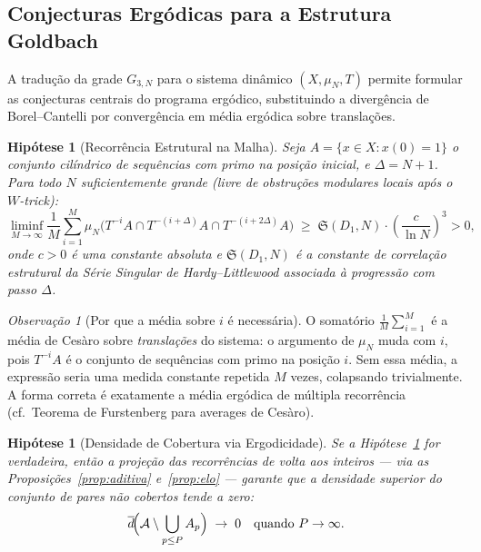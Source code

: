 \documentclass[12pt,a4paper]{article}
\newtheorem{hypothesis}[theorem]{Hip\'otese}
\theoremstyle{remark}
\newtheorem{remark}[theorem]{Observa\c{c}\~ao}
\newcommand{\calA}{\mathcal{A}}
\begin{document}
	\subsection{Conjecturas Ergódicas para a Estrutura Goldbach}
	
	A tradu\c{c}\~ao da grade $G_{3,N}$ para o sistema din\^amico $(X, \mu_N, T)$ permite
	formular as conjecturas centrais do programa erg\'odico, substituindo a diverg\^encia
	de Borel--Cantelli por converg\^encia em m\'edia erg\'odica sobre translações.
	
	\begin{hypothesis}[Recorr\^encia Estrutural na Malha]
		\label{hyp:ergodica}
		Seja $A = \{x\in X : x(0)=1\}$ o conjunto cil\'indrico de sequ\^encias com primo
		na posi\c{c}\~ao inicial, e $\Delta = N+1$.
		Para todo $N$ suficientemente grande (livre de obstru\c{c}\~oes modulares locais
		ap\'os o $W$-trick):
		\[
		\liminf_{M \to \infty} \frac{1}{M} \sum_{i=1}^{M}
		\mu_N\!\bigl(T^{-i}A \cap T^{-(i+\Delta)}A \cap T^{-(i+2\Delta)}A\bigr)
		\;\geq\; \mathfrak{S}(D_1, N) \cdot \left(\frac{c}{\ln N}\right)^3 > 0,
		\]
		onde $c>0$ \'e uma constante absoluta e $\mathfrak{S}(D_1,N)$ \'e a constante de
		correla\c{c}\~ao estrutural da S\'erie Singular de Hardy--Littlewood
		associada \`a progress\~ao com passo $\Delta$.
	\end{hypothesis}
	
	\begin{remark}[Por que a m\'edia sobre $i$ \'e necess\'aria]
		O somatório $\frac{1}{M}\sum_{i=1}^M$ \'e a m\'edia de Ces\`aro sobre
		\emph{transla\c{c}\~oes} do sistema: o argumento de $\mu_N$ muda com $i$,
		pois $T^{-i}A$ \'e o conjunto de sequ\^encias com primo na posi\c{c}\~ao $i$.
		Sem essa m\'edia, a express\~ao seria uma medida constante repetida $M$ vezes,
		colapsando trivialmente. A forma correta \'e exatamente a m\'edia erg\'odica de
		m\'ultipla recorr\^encia (cf.\ Teorema de Furstenberg para averages de Ces\`aro).
	\end{remark}
	
	\begin{hypothesis}[Densidade de Cobertura via Ergodicidade]
		\label{hyp:cobertura-ergodica}
		Se a Hip\'otese~\ref{hyp:ergodica} for verdadeira, ent\~ao a proje\c{c}\~ao
		das recorr\^encias de volta aos inteiros --- via as Proposi\c{c}\~oes~\ref{prop:aditiva}
		e~\ref{prop:elo} --- garante que a densidade superior do conjunto de pares n\~ao cobertos
		tende a zero:
		\[
		\overline{d}\!\Bigl(\calA \setminus \bigcup_{p \leq P} A_p\Bigr) \;\to\; 0
		\quad\text{quando } P\to\infty.
		\]
	\end{hypothesis}
	
\end{document}

